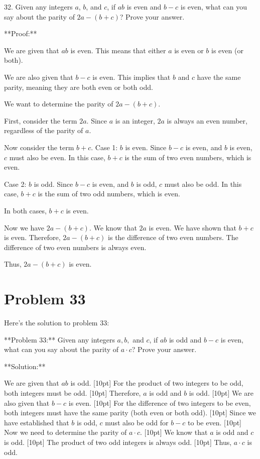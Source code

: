 \documentclass{article}
\begin{document}
32. Given any integers $a$, $b$, and $c$, if $ab$ is even and $b - c$ is even, what can you say about the parity of $2a - (b + c)$? Prove your answer.

**Proof:**

We are given that $ab$ is even. This means that either $a$ is even or $b$ is even (or both).

We are also given that $b - c$ is even. This implies that $b$ and $c$ have the same parity, meaning they are both even or both odd.

We want to determine the parity of $2a - (b + c)$.

First, consider the term $2a$. Since $a$ is an integer, $2a$ is always an even number, regardless of the parity of $a$.

Now consider the term $b + c$.
Case 1: $b$ is even.
Since $b - c$ is even, and $b$ is even, $c$ must also be even.
In this case, $b + c$ is the sum of two even numbers, which is even.

Case 2: $b$ is odd.
Since $b - c$ is even, and $b$ is odd, $c$ must also be odd.
In this case, $b + c$ is the sum of two odd numbers, which is even.

In both cases, $b + c$ is even.

Now we have $2a - (b + c)$.
We know that $2a$ is even.
We have shown that $b + c$ is even.
Therefore, $2a - (b + c)$ is the difference of two even numbers. The difference of two even numbers is always even.

Thus, $2a - (b + c)$ is even.

\newpage

\section*{Problem 33}
Here's the solution to problem 33:

**Problem 33:** Given any integers $a, b,$ and $c$, if $ab$ is odd and $b - c$ is even, what can you say about the parity of $a \cdot c$? Prove your answer.

**Solution:**

We are given that $ab$ is odd.
[10pt]
For the product of two integers to be odd, both integers must be odd.
[10pt]
Therefore, $a$ is odd and $b$ is odd.
[10pt]
We are also given that $b - c$ is even.
[10pt]
For the difference of two integers to be even, both integers must have the same parity (both even or both odd).
[10pt]
Since we have established that $b$ is odd, $c$ must also be odd for $b - c$ to be even.
[10pt]
Now we need to determine the parity of $a \cdot c$.
[10pt]
We know that $a$ is odd and $c$ is odd.
[10pt]
The product of two odd integers is always odd.
[10pt]
Thus, $a \cdot c$ is odd.
\end{document}

